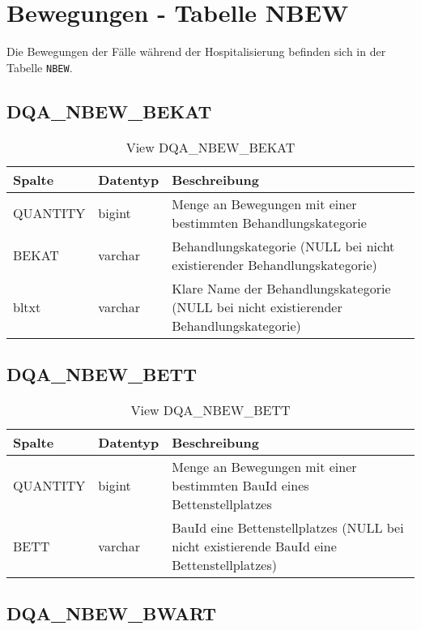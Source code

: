\chapter{Bewegungen - Tabelle NBEW}
  Die Bewegungen der Fälle während der Hospitalisierung befinden sich in der Tabelle \texttt{NBEW}.

  \section{DQA\_NBEW\_BEKAT}

  \begin{table}[ht]
    \centering
    \caption{View DQA\_NBEW\_BEKAT}
    \label{tab:dqanbewbekat}
    \begin{tabular}{||l|l|p{10cm}||}
      \hline
      Spalte & Datentyp & Beschreibung \\ [0.5ex] \hline \hline
QUANTITY & bigint & Menge an Bewegungen mit einer bestimmten Behandlungskategorie \\ \hline
BEKAT & varchar & Behandlungskategorie (NULL bei nicht existierender Behandlungskategorie)\\ \hline
bltxt & varchar & Klare Name der Behandlungskategorie (NULL bei nicht existierender Behandlungskategorie)\\ \hline
    \end{tabular}
  \end{table}
\clearpage
  \section{DQA\_NBEW\_BETT}

  \begin{table}[ht]
    \centering
    \caption{View DQA\_NBEW\_BETT}
    \label{tab:dqanbewbett}
    \begin{tabular}{||l|l|p{10cm}||}
      \hline
      Spalte & Datentyp & Beschreibung \\ [0.5ex] \hline \hline
QUANTITY & bigint & Menge an Bewegungen mit einer bestimmten BauId eines Bettenstellplatzes \\ \hline
BETT & varchar & BauId eine Bettenstellplatzes (NULL bei nicht existierende BauId eine Bettenstellplatzes)\\ \hline
    \end{tabular}
  \end{table}

  \section{DQA\_NBEW\_BWART}

